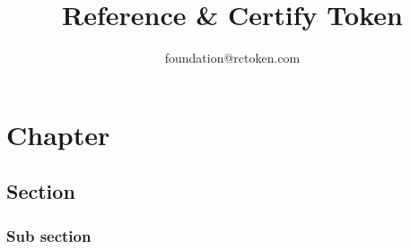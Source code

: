 \documentclass[a4paper,oneside,openany]{tufte-book}
\title{Reference \& Certify Token}
\author{foundation@rctoken.com}
\begin{document}
\maketitle
\tableofcontents






\chapter{Chapter}
\lipsum[1]
\section{Section}
\lipsum[1]
\subsection{Sub section}
\lipsum[2]
\end{document}
